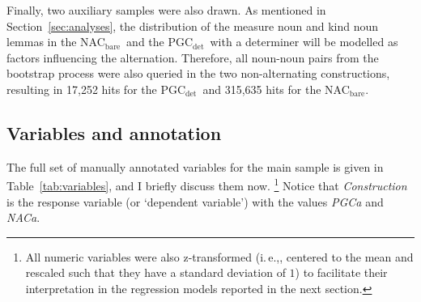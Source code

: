 \documentclass[USenglish]{article}
\newcommand{\ie}{i.\,e.,}
\newcommand{\Sub}[1]{\ensuremath{\mathrm{_{#1}}}}
\newcommand{\NACb}{NAC\Sub{bare}}
\newcommand{\PGCd}{PGC\Sub{det}}
\begin{document}
Finally, two auxiliary samples were also drawn.
As mentioned in Section~\ref{sec:analyses}, the distribution of the measure noun and kind noun lemmas in the \NACb\ and the \PGCd\ with a determiner will be modelled as factors influencing the alternation.
Therefore, all noun-noun pairs from the bootstrap process were also queried in the two non-alternating constructions, resulting in 17,252 hits for the \PGCd\ and 315,635 hits for the \NACb.



\subsection{Variables and annotation}
\label{sec:annotation}

The full set of manually annotated variables for the main sample is given in Table~\ref{tab:variables}, and I briefly discuss them now.%
\footnote{All numeric variables were also z-transformed (\ie, centered to the mean and rescaled such that they have a standard deviation of $1$) to facilitate their interpretation in the regression models reported in the next section.}
Notice that \textit{Construction} is the response variable (or `dependent variable') with the values \textit{PGCa} and \textit{NACa}.
\end{document}
